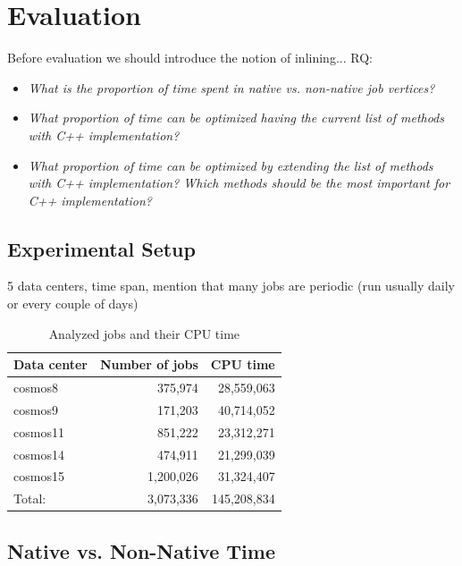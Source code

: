 \section{Evaluation}
Before evaluation we should introduce the notion of inlining...
RQ:
\begin{itemize}
\item \emph{What is the proportion of time spent in native vs. non-native job vertices?}

\item \emph{What proportion of time can be optimized having the current list of methods with C++ implementation?}

\item \emph{What proportion of time can be optimized by extending the list of methods with C++ implementation? Which methods should be the most important for C++ implementation?}


\end{itemize}

\subsection{Experimental Setup}
5 data centers, time span, mention that many jobs are periodic (run usually daily or every couple of days)

\begin{table}[ht]
\centering
\begin{tabular}{lrr}

  Data center & Number of jobs & CPU time \\
 \midrule
cosmos8 & 375,974 & 28,559,063 \\
cosmos9 & 171,203 & 40,714,052 \\
cosmos11 & 851,222 & 23,312,271\\
cosmos14 & 474,911 & 21,299,039\\
cosmos15 & 1,200,026 & 31,324,407 \\
\midrule
Total: & 3,073,336 & 145,208,834\\
\midrule

\end{tabular}
 \label{tb:projects}
 \caption{Analyzed jobs and their CPU time}
\end{table}




\subsection{Native vs. Non-Native Time}


